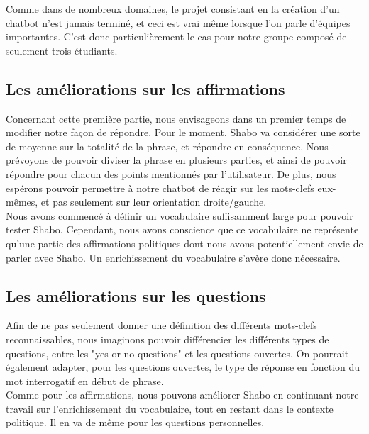 \documentclass[paper=a4]{article}
\begin{document}
Comme dans de nombreux domaines, le projet consistant en la création
d'un chatbot n'est jamais terminé, et ceci est vrai même lorsque l'on
parle d'équipes importantes. C'est donc particulièrement le cas pour
notre groupe composé de seulement trois étudiants.

\subsection{Les améliorations sur les affirmations}

Concernant cette première partie, nous envisageons dans un premier temps
de modifier notre façon de répondre. Pour le moment, Shabo va considérer
une sorte de moyenne sur la totalité de la phrase, et répondre en
conséquence. Nous prévoyons de pouvoir diviser la phrase en plusieurs
parties, et ainsi de pouvoir répondre pour chacun des points mentionnés
par l'utilisateur. De plus, nous espérons pouvoir permettre à notre
chatbot de réagir sur les mots-clefs eux-mêmes, et pas seulement sur
leur orientation droite/gauche. \\

Nous avons commencé à définir un vocabulaire suffisamment large pour
pouvoir tester Shabo. Cependant, nous avons conscience que ce
vocabulaire ne représente qu'une partie des affirmations politiques dont
nous avons potentiellement envie de parler avec Shabo. Un enrichissement
du vocabulaire s'avère donc nécessaire. \\

\subsection{Les améliorations sur les questions}

Afin de ne pas seulement donner une définition des différents mots-clefs
reconnaissables, nous imaginons pouvoir différencier les différents
types de questions, entre les "yes or no questions" et les questions
ouvertes. On pourrait également adapter, pour les questions ouvertes,
le type de réponse en fonction du mot interrogatif en début de phrase. \\

Comme pour les affirmations, nous pouvons améliorer Shabo en continuant
notre travail sur l'enrichissement du vocabulaire, tout en restant dans
le contexte politique. Il en va de même pour les questions personnelles.

\end{document}
